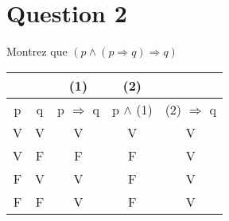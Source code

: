 \section*{Question 2}
Montrez que \((p \wedge (p \Rightarrow q) \Rightarrow q)\)
\bigskip

\begin{tabular}{|cc|c|c|c|}
	\multicolumn{2}{c}{} & \multicolumn{1}{c}{(1)} & \multicolumn{1}{c}{(2)} \\ \hline
	p & q & p $\Rightarrow$ q & p $\wedge$ (1) & (2) $\Rightarrow$ q \\ \hline
	V & V &           V           &       V        &          V          \\ \hline
	V & F &           F           &       F        &          V          \\ \hline
	F & V &           V           &       F        &          V          \\ \hline
	F & F &           V           &       F        &          V          \\ \hline
\end{tabular}